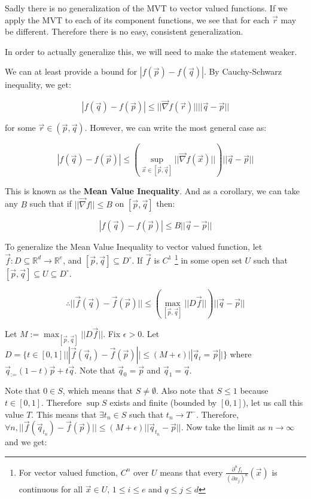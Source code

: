 \documentclass[11 pt, twoside]{article}
\newcommand{\gradient}{\vec{\nabla}}
\begin{document}
Sadly there is no generalization of the MVT to vector valued functions. If we
apply the MVT to each of its component functions, we see that for each $\vec{r}$
may be different. Therefore there is no easy, consistent generalization.

In order to actually generalize this, we will need to make the statement weaker.

We can at least provide a bound for $|f(\vec{p}) - f(\vec{q})|$. By
Cauchy-Schwarz inequality, we get:

$$|f(\vec{q}) - f(\vec{p})| \leq ||\gradient f(\vec{r})|| ||\vec{q} -
\vec{p}||$$

for some $\vec{r} \in (\vec{p}, \vec{q})$. However, we can write the most
general case as:

$$\boxed{|f(\vec{q}) - f(\vec{p})| \leq \left(\sup_{\vec{x} \in [\vec{p} , \vec{q}]}
||\gradient f(\vec{x})||\right) ||\vec{q} - \vec{p}||}$$

This is known as the \textbf{Mean Value Inequality}. And as a corollary, we can
take any $B$ such that if $ ||\gradient f|| \leq B$ on $[\vec{p}, \vec{q}]$
then:

$$|f(\vec{q}) - f(\vec{p})| \leq B ||\vec{q} - \vec{p}||$$

To generalize the Mean Value Inequality to vector valued function, let $\vec{f}:
D \subseteq \mathbb{R}^d \to \mathbb{R}^e$, and $[\vec{p}, \vec{q}]
\subseteq D^\circ$. If $\vec{f}$ is $C^1$ \footnote{For vector valued function,
$C^n$ over $U$ means that every $\frac{\partial^n f_i}{(\partial x_j)^n}(\vec{x})$ is
continuous for all $\vec{x} \in U$, $1 \leq i \leq e$ and $q \leq j \leq d$} in
some open set $U$ such that $[\vec{p}, \vec{q}] \subseteq U \subseteq D^\circ$.

$$\boxed{\therefore ||\vec{f}(\vec{q}) - \vec{f}(\vec{p})|| \leq
\left(\max_{[\vec{p}, \vec{q}]} ||D\vec{f}||\right) ||\vec{q} -
\vec{p}||}$$

Let $M := \max_{[\vec{p}, \vec{q}]} ||D\vec{f}||$. Fix $\epsilon > 0$.
Let $D = \{t \in [0, 1] | ||\vec{f}(\vec{q}_t) - \vec{f}(\vec{p})|| \leq
(M + \epsilon) ||\vec{q}_t = \vec{p}||\}$ where $\vec{q}_:= (1 -
t)\vec{p} + t\vec{q}$. Note that $\vec{q}_0 = \vec{p}$ and $\vec{q}_1 =
\vec{q}$.

Note that $0 \in S$, which means that $S \neq \emptyset$. Also note that $S \leq
1$ because $t \in [0, 1]$. Therefore $\sup S$ exists and finite (bounded by $[0,
1]$), let us call this value $T$. This means that $\exists t_n \in S$ such
that $t_n \to T^-$. Therefore, $\forall n, ||\vec{f}(\vec{q}_{t_n}) -
\vec{f}(\vec{p})|| \leq (M + \epsilon) ||\vec{q}_{t_n} - \vec{p}||$. Now take the
limit as $n \to \infty$ and we get:
\end{document}
